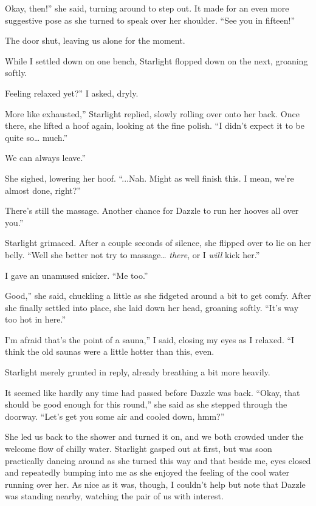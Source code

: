 \leavevmode{}Okay, then!” she said, turning around to step out. It made for an even more suggestive pose as she turned to speak over her shoulder. “See you in fifteen!”

The door shut, leaving us alone for the moment.

While I settled down on one bench, Starlight flopped down on the next, groaning softly.

\leavevmode{}Feeling relaxed yet?” I asked, dryly.

\leavevmode{}More like exhausted,” Starlight replied, slowly rolling over onto her back. Once there, she lifted a hoof again, looking at the fine polish. “I didn’t expect it to be quite so… much.”

\leavevmode{}We can always leave.”

She sighed, lowering her hoof. “...Nah. Might as well finish this. I mean, we’re almost done, right?”

\leavevmode{}There’s still the massage. Another chance for Dazzle to run her hooves all over you.”

Starlight grimaced. After a couple seconds of silence, she flipped over to lie on her belly. “Well she better not try to massage… \textit{there}, or I \textit{will} kick her.”

I gave an unamused snicker. “Me too.”

\leavevmode{}Good,” she said, chuckling a little as she fidgeted around a bit to get comfy. After she finally settled into place, she laid down her head, groaning softly. “It’s way too hot in here.”

\leavevmode{}I’m afraid that’s the point of a sauna,” I said, closing my eyes as I relaxed. “I think the old saunas were a little hotter than this, even.

Starlight merely grunted in reply, already breathing a bit more heavily.

It seemed like hardly any time had passed before Dazzle was back. “Okay, that should be good enough for this round,” she said as she stepped through the doorway. “Let’s get you some air and cooled down, hmm?”

She led us back to the shower and turned it on, and we both crowded under the welcome flow of chilly water. Starlight gasped out at first, but was soon practically dancing around as she turned this way and that beside me, eyes closed and repeatedly bumping into me as she enjoyed the feeling of the cool water running over her. As nice as it was, though, I couldn’t help but note that Dazzle was standing nearby, watching the pair of us with interest.

